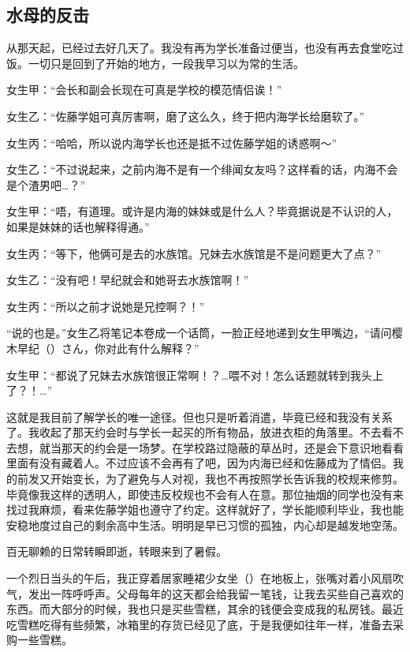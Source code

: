 \newpage
\subsection{水母的反击}
\newday{\sunny}

从那天起，已经过去好几天了。我没有再为学长准备过便当，也没有再去食堂吃过饭。一切只是回到了开始的地方，一段我早习以为常的生活。

女生甲：“会长和副会长现在可真是学校的模范情侣诶！”

女生乙：“佐藤学姐可真厉害啊，磨了这么久，终于把内海学长给磨软了。”

女生丙：“哈哈，所以说内海学长也还是抵不过佐藤学姐的诱惑啊～”

女生乙：“不过说起来，之前内海不是有一个绯闻女友吗？这样看的话，内海不会是个渣男吧…？”

女生甲：“唔，有道理。或许是内海的妹妹或是什么人？毕竟据说是不认识的人，如果是妹妹的话也解释得通。”

女生丙：“等下，他俩可是去的水族馆。兄妹去水族馆是不是问题更大了点？”

女生乙：“没有吧！早纪就会和她哥去水族馆啊！”

女生丙：“所以之前才说她是兄控啊？！”

“说的也是。”女生乙将笔记本卷成一个话筒，一脸正经地递到女生甲嘴边，“请问樱木早纪（）さん，你对此有什么解释？”

女生甲：“都说了兄妹去水族馆很正常啊！？…喂不对！怎么话题就转到我头上了？！…”

这就是我目前了解学长的唯一途径。但也只是听着消遣，毕竟已经和我没有关系了。我收起了那天约会时与学长一起买的所有物品，放进衣柜的角落里。不去看不去想，就当那天的约会是一场梦。在学校路过隐蔽的草丛时，还是会下意识地看看里面有没有藏着人。不过应该不会再有了吧，因为内海已经和佐藤成为了情侣。我的前发又开始变长，为了避免与人对视，我也不再按照学长告诉我的校规来修剪。毕竟像我这样的透明人，即使违反校规也不会有人在意。那位抽烟的同学也没有来找过我麻烦，看来佐藤学姐也遵守了约定。这样就好了，学长能顺利毕业，我也能安稳地度过自己的剩余高中生活。明明是早已习惯的孤独，内心却是越发地空荡。

百无聊赖的日常转瞬即逝，转眼来到了暑假。

\cutlineg\timepast

\newday{\icecream\sunny}

一个烈日当头的午后，我正穿着居家睡裙少女坐（）在地板上，张嘴对着小风扇吹气，发出一阵呼呼声。父母每年的这天都会给我留一笔钱，让我去买些自己喜欢的东西。而大部分的时候，我也只是买些雪糕，其余的钱便会变成我的私房钱。最近吃雪糕吃得有些频繁，冰箱里的存货已经见了底，于是我便如往年一样，准备去采购一些雪糕。

